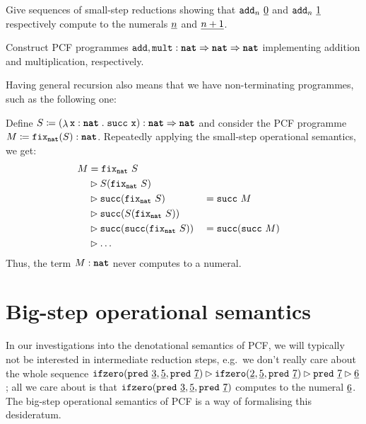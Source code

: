 \begin{exercise}\label{exer:small-step-addition}
  Give sequences of small-step reductions showing that
  \(\pcfadd_n \, \numeral 0\) and \(\pcfadd_n \, \numeral 1\) respectively
  compute to the numerals \(\numeral n\) and \(\numeral {n+1}\).
\end{exercise}

\begin{exercise}\label{exer:pcf-add-mult}
  Construct PCF programmes
  \(\pcfadd,\pcffont{mult} : \pcfnat \pcffun \pcfnat \pcffun \pcfnat\)
  implementing addition and multiplication, respectively.
\end{exercise}

Having general recursion also means that we have non-terminating programmes, such
as the following one:

\begin{example}\label{exam:non-termination}
  Define
  \(S \coloneqq \pa*{\lambdadot{\var x : \pcfnat}{\pcfsuc \, \var x}} : \pcfnat
  \pcffun \pcfnat\) and consider the PCF programme
  \(M \coloneqq \pcffix_{\pcfnat}(S) : \pcfnat\).  Repeatedly applying the
  small-step operational semantics, we get:
  \begin{alignat*}{3}
    M &= \pcffix_{\pcfnat} \, S \\
    &\smallstep
       S(\pcffix_{\pcfnat} \, S)\\
    &\smallstep
      \pcfsuc(\pcffix_{\pcfnat} \, S)
    &&= \pcfsuc \, M \\
    &\smallstep
      \pcfsuc\pa*{S\pa*{\pcffix_{\pcfnat} \, S}} \\
    &\smallstep
      \pcfsuc\pa*{\pcfsuc\pa*{\pcffix_{\pcfnat} \, S}}
    &&= \pcfsuc\pa*{\pcfsuc\, M} \\
    &\smallstep \dots
  \end{alignat*}
  Thus, the term \(M : \pcfnat\) never computes to a numeral.
\end{example}

\section{Big-step operational semantics}

In our investigations into the denotational semantics of PCF, we will typically
not be interested in intermediate reduction steps, e.g.\ we don't really care
about the whole sequence
\(\pcfifz(\pcfpred\,\numeral{3},\numeral{5},\pcfpred\,\numeral{7}) \smallstep
\pcfifz(\numeral{2},\numeral{5},\pcfpred\,\numeral{7}) \smallstep
\pcfpred\,\numeral{7} \smallstep \numeral{6}\); all we care about is that
\(\pcfifz(\pcfpred\,\numeral{3},\numeral{5},\pcfpred\,\numeral{7})\) computes to
the numeral \(\numeral{6}\).
%
The big-step operational semantics of PCF is a way of formalising this
desideratum.

